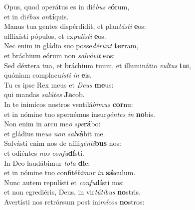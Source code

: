 \evenverse Opus, quod operátus es in dié\textit{bus} \textit{e}\textbf{ó}rum,~\*\\
\evenverse et in di\textit{é}\textit{bus} \textit{an}\textbf{tí}quis.\\
\oddverse Manus tua gentes dispérdidit, et plan\textit{tá}\textit{sti} \textbf{e}os:~\*\\
\oddverse afflixísti pópulos, et ex\textit{pu}\textit{lí}\textit{sti} \textbf{e}os.\\
\evenverse Nec enim in gládio suo posse\textit{dé}\textit{runt} \textbf{ter}ram,~\*\\
\evenverse et bráchium eórum non \textit{sal}\textit{vá}\textit{vit} \textbf{e}os:\\
\oddverse Sed déxtera tua, et bráchium tuum, et illuminátio \textit{vul}\textit{tus} \textbf{tu}i,~\*\\
\oddverse quóniam complacu\textit{í}\textit{sti} \textit{in} \textbf{e}is.\\
\evenverse Tu es ipse Rex meus et \textit{De}\textit{us} \textbf{me}us:~\*\\
\evenverse qui mandas \textit{sa}\textit{lú}\textit{tes} \textbf{Ja}cob.\\
\oddverse In te inimícos nostros ventilá\textit{bi}\textit{mus} \textbf{cor}nu:~\*\\
\oddverse et in nómine tuo spernémus insur\textit{gén}\textit{tes} \textit{in} \textbf{no}bis.\\
\evenverse Non enim in arcu me\textit{o} \textit{spe}\textbf{rá}bo:~\*\\
\evenverse et gládius me\textit{us} \textit{non} \textit{sal}\textbf{vá}bit me.\\
\oddverse Salvásti enim nos de affli\textit{gén}\textit{ti}\textbf{bus} nos:~\*\\
\oddverse et odiéntes \textit{nos} \textit{con}\textit{fu}\textbf{dí}sti.\\
\evenverse In Deo laudábimur \textit{to}\textit{ta} \textbf{di}e:~\*\\
\evenverse et in nómine tuo confité\textit{bi}\textit{mur} \textit{in} \textbf{sǽ}culum.\\
\oddverse Nunc autem repulísti et \textit{con}\textit{fu}\textbf{dí}sti nos:~\*\\
\oddverse et non egrediéris, Deus, in vir\textit{tú}\textit{ti}\textit{bus} \textbf{no}stris.\\
\evenverse Avertísti nos retrórsum post ini\textit{mí}\textit{cos} \textbf{no}stros:~\*\\
